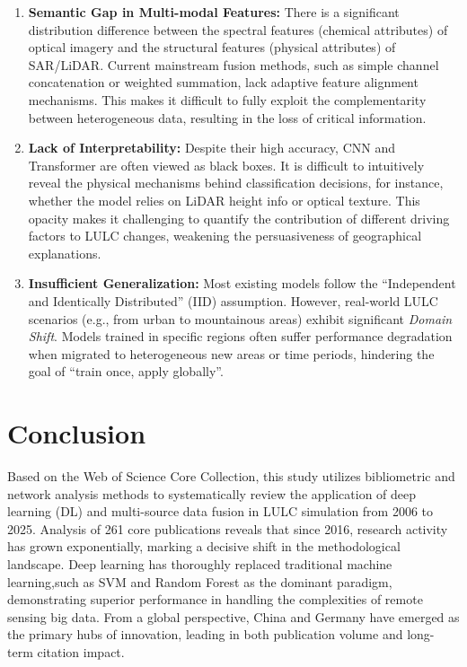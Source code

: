 \documentclass[]{interact}
\theoremstyle{plain}%
\theoremstyle{definition}
\theoremstyle{remark}
\begin{document}
\begin{enumerate}
	\item \textbf{Semantic Gap in Multi-modal Features:} There is a significant distribution difference between the spectral features (chemical attributes) of optical imagery and the structural features (physical attributes) of SAR/LiDAR. Current mainstream fusion methods, such as simple channel concatenation or weighted summation, lack adaptive feature alignment mechanisms. This makes it difficult to fully exploit the complementarity between heterogeneous data, resulting in the loss of critical information.
	
	\item \textbf{Lack of Interpretability:} Despite their high accuracy, CNN and Transformer are often viewed as black boxes. It is difficult to intuitively reveal the physical mechanisms behind classification decisions, for instance, whether the model relies on LiDAR height info or optical texture. This opacity makes it challenging to quantify the contribution of different driving factors to LULC changes, weakening the persuasiveness of geographical explanations.
	
	\item \textbf{Insufficient Generalization:} Most existing models follow the ``Independent and Identically Distributed'' (IID) assumption. However, real-world LULC scenarios (e.g., from urban to mountainous areas) exhibit significant \textit{Domain Shift}. Models trained in specific regions often suffer performance degradation when migrated to heterogeneous new areas or time periods, hindering the goal of ``train once, apply globally''. 
\end{enumerate}



\section{Conclusion}
Based on the Web of Science Core Collection, this study utilizes bibliometric and network analysis methods to systematically review the application of deep learning (DL) and multi-source data fusion in LULC simulation from 2006 to 2025. Analysis of 261 core publications reveals that since 2016, research activity has grown exponentially, marking a decisive shift in the methodological landscape. Deep learning has thoroughly replaced traditional machine learning,such as SVM and Random Forest as the dominant paradigm, demonstrating superior performance in handling the complexities of remote sensing big data. From a global perspective, China and Germany have emerged as the primary hubs of innovation, leading in both publication volume and long-term citation impact.
\end{document}

